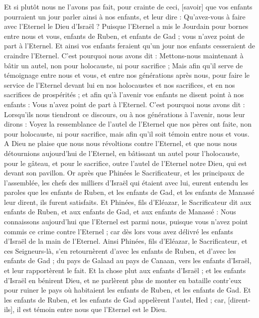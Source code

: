\begin{multicols}{2}
Et si plutôt nous ne l'avons pas fait, pour crainte de ceci, [savoir] que vos enfants pourraient un jour parler ainsi à nos enfants, et leur dire : Qu'avez-vous à faire avec l'Eternel le Dieu d'Israël ?
Puisque l'Eternel a mis le Jourdain pour bornes entre nous et vous, enfants de Ruben, et enfants de Gad ; vous n'avez point de part à l'Eternel. Et ainsi vos enfants feraient qu'un jour nos enfants cesseraient de craindre l'Eternel.
C'est pourquoi nous avons dit : Mettons-nous maintenant à bâtir un autel, non pour holocauste, ni pour sacrifice ;
Mais afin qu'il serve de témoignage entre nous et vous, et entre nos générations après nous, pour faire le service de l'Eternel devant lui en nos holocaustes et nos sacrifices, et en nos sacrifices de prospérités ; et afin qu'à l'avenir vos enfants ne disent point à nos enfants : Vous n'avez point de part à l'Eternel.
C'est pourquoi nous avons dit : Lorsqu'ils nous tiendront ce discours, ou à nos générations à l'avenir, nous leur dirons : Voyez la ressemblance de l'autel de l'Eternel que nos pères ont faite, non pour holocauste, ni pour sacrifice, mais afin qu'il soit témoin entre nous et vous.
A Dieu ne plaise que nous nous révoltions contre l'Eternel, et que nous nous détournions aujourd'hui de l'Eternel, en bâtissant un autel pour l'holocauste, pour le gâteau, et pour le sacrifice, outre l'autel de l'Eternel notre Dieu, qui est devant son pavillon.
Or après que Phinées le Sacrificateur, et les principaux de l'assemblée, les chefs des milliers d'Israël qui étaient avec lui, eurent entendu les paroles que les enfants de Ruben, et les enfants de Gad, et les enfants de Manassé leur dirent, ils furent satisfaits.
Et Phinées, fils d'Eléazar, le Sacrificateur dit aux enfants de Ruben, et aux enfants de Gad, et aux enfants de Manassé : Nous connaissons aujourd'hui que l'Eternel est parmi nous, puisque vous n'avez point commis ce crime contre l'Eternel ; car dès lors vous avez délivré les enfants d'Israël de la main de l'Eternel.
Ainsi Phinées, fils d'Eléazar, le Sacrificateur, et ces Seigneurs-là, s'en retournèrent d'avec les enfants de Ruben, et d'avec les enfants de Gad ; du pays de Galaad au pays de Canaan, vers les enfants d'Israël, et leur rapportèrent le fait.
Et la chose plut aux enfants d'Israël ; et les enfants d'Israël en bénirent Dieu, et ne parlèrent plus de monter en bataille contr'eux pour ruiner le pays où habitaient les enfants de Ruben, et les enfants de Gad.
Et les enfants de Ruben, et les enfants de Gad appelèrent l'autel, Hed ; car, [dirent-ils], il est témoin entre nous que l'Eternel est le Dieu.

\end{multicols}
